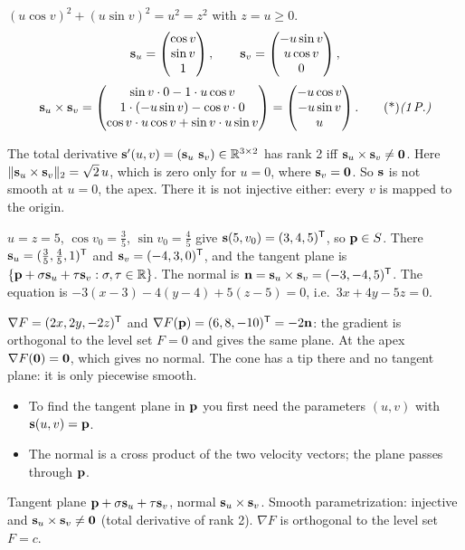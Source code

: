 \begin{solution}
 $(u\cos v)^2+(u\sin v)^2=u^2=z^2$ with $z=u\ge0$. 
\[
\mathbf{s}_u=\begin{pmatrix}\cos v\\\sin v\\1\end{pmatrix},\qquad \mathbf{s}_v=\begin{pmatrix}-u\sin v\\u\cos v\\0\end{pmatrix},
\]
\[
\vb s_u\times\vb s_v=\begin{pmatrix}\sin v\cdot0-1\cdot u\cos v\\1\cdot(-u\sin v)-\cos v\cdot0\\\cos v\cdot u\cos v+\sin v\cdot u\sin v\end{pmatrix}=\begin{pmatrix}-u\cos v\\-u\sin v\\u\end{pmatrix}.\ptd{1}
\]

 The total derivative $\vb s'(u,v)=(\vb s_u\ \vb s_v)\in\R^{3\times2}$ has rank 2 iff $\mathbf{s}_u\times\mathbf{s}_v\neq\mathbf{0}$. Here $\lVert \mathbf{s}_u\times\mathbf{s}_v\rVert_2=\sqrt2\,u$, which is zero only for $u=0$, where $\mathbf{s}_v=\mathbf{0}$. 
So $\mathbf{s}$ is not smooth at $u=0$, the apex. There it is not injective either: every $v$ is mapped to the origin. 

 $u=z=5$, $\cos v_0=\frac35$, $\sin v_0=\frac45$ give $\mathbf{s}(5,v_0)=(3,4,5)^{\mathsf{T}}$, so $\mathbf{p}\in S$. 
There $\mathbf{s}_u=(\frac35,\frac45,1)^{\mathsf{T}}$ and $\mathbf{s}_v=(-4,3,0)^{\mathsf{T}}$, and the tangent plane is $\{\mathbf{p}+\sigma\mathbf{s}_u+\tau\mathbf{s}_v:\sigma,\tau\in\mathbb{R}\}$. 
The normal is $\mathbf{n}=\mathbf{s}_u\times\mathbf{s}_v=(-3,-4,5)^{\mathsf{T}}$. The equation is $-3(x-3)-4(y-4)+5(z-5)=0$, i.e.\ $3x+4y-5z=0$. 

 $\nabla F=(2x,2y,-2z)^{\mathsf{T}}$ and $\nabla F(\mathbf{p})=(6,8,-10)^{\mathsf{T}}=-2\mathbf{n}$: the gradient is orthogonal to the level set $F=0$ and gives the same plane. At the apex $\nabla F(\mathbf{0})=\mathbf{0}$, which gives no normal. The cone has a tip there and no tangent plane: it is only piecewise smooth. 

\begin{trap}
\begin{itemize}
\item To find the tangent plane in $\mathbf{p}$ you first need the parameters $(u,v)$ with $\mathbf{s}(u,v)=\mathbf{p}$.
\item The normal is a cross product of the two velocity vectors; the plane passes through $\mathbf{p}$.
\end{itemize}
\end{trap}
\begin{heart}
Tangent plane $\mathbf{p}+\sigma\mathbf{s}_u+\tau\mathbf{s}_v$, normal $\mathbf{s}_u\times\mathbf{s}_v$. Smooth parametrization: injective and $\mathbf{s}_u\times\mathbf{s}_v\neq\mathbf{0}$ (total derivative of rank 2). $\nabla F$ is orthogonal to the level set $F=c$.
\end{heart}
\end{solution}


